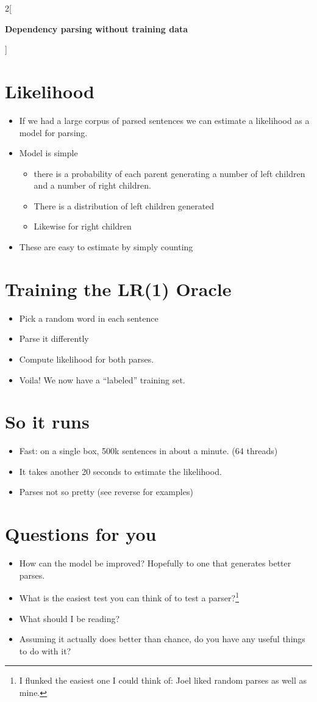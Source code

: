 \documentclass[12pt]{extarticle}
\begin{document}
\begin{multicols*}{2}[
\centerline{\Huge\bf Dependency parsing without training data}
\vspace{2ex}
]
\section*{Likelihood}
\begin{itemize}
\item If we had a large corpus of parsed sentences we can estimate a
likelihood as a model for parsing.
\item Model is simple
\begin{itemize}
\item  there is a probability of each parent
generating a number of left children and a number of right children.
\item There is a distribution of left children generated
\item Likewise for right children
\end{itemize}
\item These are easy to estimate by simply counting
\end{itemize}

\section*{Training the LR(1) Oracle}
\begin{itemize}
\item Pick a random word in each sentence
\item Parse it differently
\item Compute likelihood for both parses.
\item Voila!  We now have a ``labeled'' training set.
\end{itemize}

\section*{So it runs}
\begin{itemize}
\item Fast: on a single box, 500k sentences in about a minute. (64 threads)
\item It takes another 20 seconds to estimate the likelihood.
\item Parses not so pretty (see reverse for examples)
\end{itemize}

\section*{Questions for you}
\begin{itemize}
\item How can the model be improved?  Hopefully to one that generates
better parses.
\item What is the easiest test you can think of to test a parser?\footnote{I
flunked the easiest one I could think of: Joel liked random parses as
well as mine.}
\item What should I be reading?
\item Assuming it actually does better than chance, do you have any
useful things to do with it?
\end{itemize}


\end{multicols*}
\end{document}
